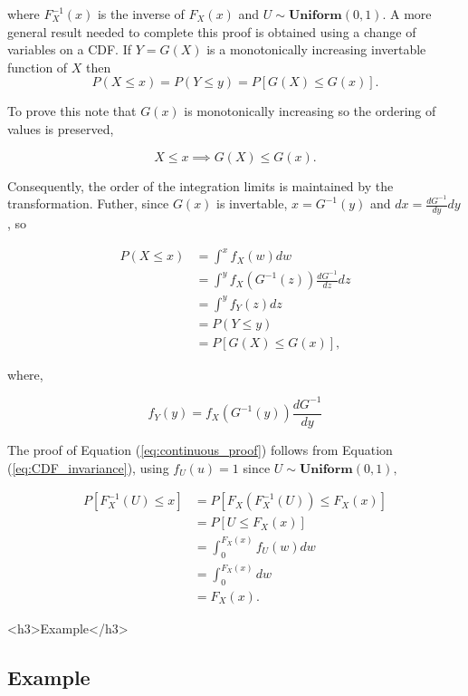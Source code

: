 \documentclass[12pt]{article}
\begin{document}
where $F_X^{-1}(x)$ is the inverse of $F_X(x)$ and $U \sim \textbf{Uniform}(0, 1)$. A more general result needed to complete
this proof is obtained using a change of variables on a CDF. If $Y=G(X)$ is a monotonically increasing invertable function of $X$ then
\begin{equation}
\label{eq:CDF_invariance}
P(X \leq x) = P(Y \leq y) = P[G(X) \leq G(x)].
\end{equation}

To prove this note that $G(x)$ is monotonically increasing so the ordering of values is preserved,

$$ X \le x \implies G(X) \le G(x).$$

Consequently, the order of the integration limits is maintained by the transformation. Futher, since $G(x)$ is invertable,
$x = G^{-1}(y)$ and $dx = \frac{dG^{-1}}{dy} dy$, so

$$
\begin{aligned}
P(X \leq x) & = \int^{x} f_X(w) dw \\
& = \int^{y} f_X(G^{-1}(z)) \frac{dG^{-1}}{dz} dz \\
& = \int^{y} f_Y(z) dz \\
& = P(Y \leq y) \\
& = P[G(X) \leq G(x)],
\end{aligned}
$$

where,

$$ f_Y(y) = f_X(G^{-1}(y)) \frac{dG^{-1}}{dy} $$

The proof of Equation (\ref{eq:continuous_proof}) follows from Equation (\ref{eq:CDF_invariance}), using $f_U(u) = 1$
since $U \sim \textbf{Uniform}(0, 1),$

$$
\begin{aligned}
P[F_X^{-1}(U) \leq x] & = P[F_X(F_X^{-1}(U)) \leq F_X(x)] \\
& = P[U \leq F_X(x)] \\
& = \int_{0}^{F_X(x)} f_U(w) dw \\
& = \int_{0}^{F_X(x)} dw \\
& = F_X(x).
\end{aligned}
$$

\ifblog
<h3>Example</h3>
\fi
\iftex
\subsection{Example}
\fi
\end{document}
